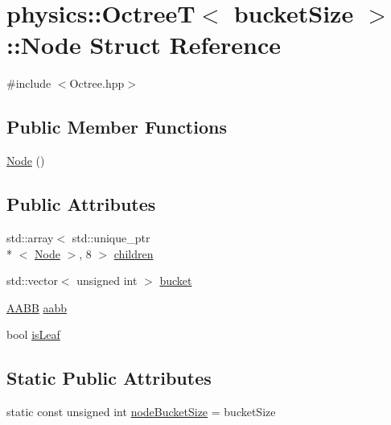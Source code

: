 \hypertarget{structphysics_1_1OctreeT_1_1Node}{\section{physics\-:\-:Octree\-T$<$ bucket\-Size $>$\-:\-:Node Struct Reference}
\label{structphysics_1_1OctreeT_1_1Node}
}


{\ttfamily \#include $<$Octree.\-hpp$>$}

\subsection*{Public Member Functions}
\begin{DoxyCompactItemize}
\item 
\hyperlink{structphysics_1_1OctreeT_1_1Node_a567044370b67e3586354d5502b7e5913}{Node} ()
\end{DoxyCompactItemize}
\subsection*{Public Attributes}
\begin{DoxyCompactItemize}
\item 
std\-::array$<$ std\-::unique\-\_\-ptr\\*
$<$ \hyperlink{structphysics_1_1OctreeT_1_1Node}{Node} $>$, 8 $>$ \hyperlink{structphysics_1_1OctreeT_1_1Node_ae36b0966ac5fce06093003d8b6350d74}{children}
\item 
std\-::vector$<$ unsigned int $>$ \hyperlink{structphysics_1_1OctreeT_1_1Node_a840c88e6152af0423b988c3f83365180}{bucket}
\item 
\hyperlink{structphysics_1_1AABB}{A\-A\-B\-B} \hyperlink{structphysics_1_1OctreeT_1_1Node_a196e782e59a6c25f4127da0a6e8d2500}{aabb}
\item 
bool \hyperlink{structphysics_1_1OctreeT_1_1Node_a69a0bf4b2fabbd8cdabc4a9510ce9978}{is\-Leaf}
\end{DoxyCompactItemize}
\subsection*{Static Public Attributes}
\begin{DoxyCompactItemize}
\item 
static const unsigned int \hyperlink{structphysics_1_1OctreeT_1_1Node_a004aad237ee1e8a63ef1b3ae7c9862b9}{node\-Bucket\-Size} = bucket\-Size
\end{DoxyCompactItemize}


